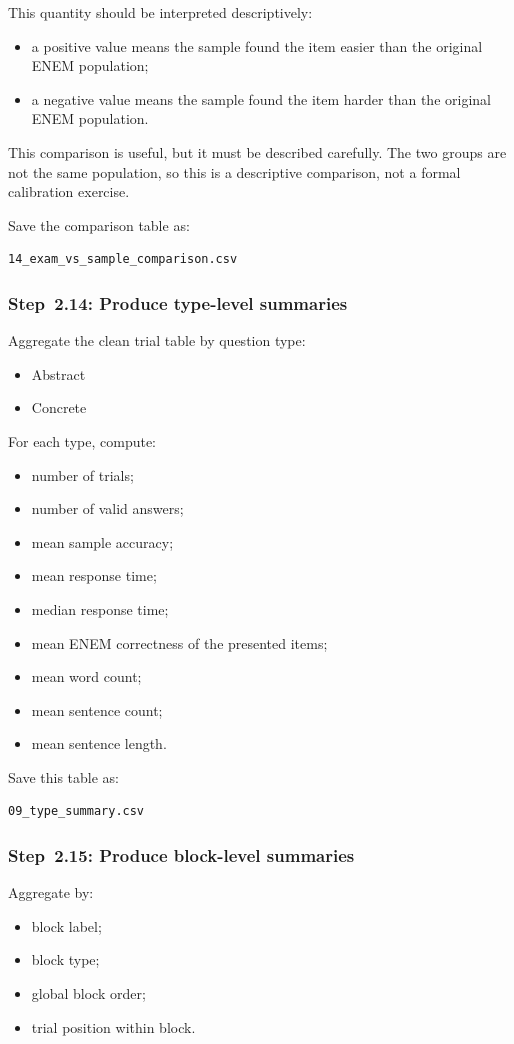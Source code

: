 This quantity should be interpreted descriptively:
\begin{itemize}
    \item a positive value means the sample found the item easier than the original ENEM population;
    \item a negative value means the sample found the item harder than the original ENEM population.
\end{itemize}

This comparison is useful, but it must be described carefully.
The two groups are not the same population, so this is a descriptive comparison, not a formal calibration exercise.

Save the comparison table as:
\begin{verbatim}
14_exam_vs_sample_comparison.csv
\end{verbatim}

\subsubsection{Step~2.14: Produce type-level summaries}
Aggregate the clean trial table by question type:
\begin{itemize}
    \item Abstract
    \item Concrete
\end{itemize}

For each type, compute:
\begin{itemize}
    \item number of trials;
    \item number of valid answers;
    \item mean sample accuracy;
    \item mean response time;
    \item median response time;
    \item mean ENEM correctness of the presented items;
    \item mean word count;
    \item mean sentence count;
    \item mean sentence length.
\end{itemize}

Save this table as:
\begin{verbatim}
09_type_summary.csv
\end{verbatim}

\subsubsection{Step~2.15: Produce block-level summaries}
Aggregate by:
\begin{itemize}
    \item block label;
    \item block type;
    \item global block order;
    \item trial position within block.
\end{itemize}

